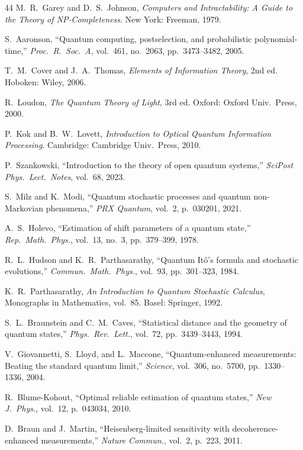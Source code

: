 \documentclass[journal,twocolumn]{IEEEtran}
\theoremstyle{definition}
\theoremstyle{plain}
\begin{document}
\begin{thebibliography}{44}
M.~R.~Garey and D.~S.~Johnson,
\emph{Computers and Intractability: A Guide to the Theory of
NP-Completeness}. New York: Freeman, 1979.

S.~Aaronson, ``Quantum computing, postselection, and probabilistic
polynomial-time,'' \emph{Proc.\ R.\ Soc.\ A}, vol.~461, no.~2063,
pp.~3473--3482, 2005.

T.~M.~Cover and J.~A.~Thomas, \emph{Elements of Information Theory},
2nd ed. Hoboken: Wiley, 2006.

R.~Loudon, \emph{The Quantum Theory of Light}, 3rd ed.
Oxford: Oxford Univ.\ Press, 2000.

P.~Kok and B.~W.~Lovett,
\emph{Introduction to Optical Quantum Information Processing}.
Cambridge: Cambridge Univ.\ Press, 2010.

P.~Szankowski, ``Introduction to the theory of open quantum
systems,'' \emph{SciPost Phys.\ Lect.\ Notes}, vol.~68, 2023.

S.~Milz and K.~Modi, ``Quantum stochastic processes and quantum
non-Markovian phenomena,'' \emph{PRX Quantum}, vol.~2,
p.~030201, 2021.

A.~S.~Holevo, ``Estimation of shift parameters of a quantum state,''
\emph{Rep.\ Math.\ Phys.}, vol.~13, no.~3, pp.~379--399, 1978.

R.~L.~Hudson and K.~R.~Parthasarathy, ``Quantum It\^{o}'s formula
and stochastic evolutions,'' \emph{Commun.\ Math.\ Phys.},
vol.~93, pp.~301--323, 1984.

K.~R.~Parthasarathy, \emph{An Introduction to Quantum Stochastic
Calculus}, Monographs in Mathematics, vol.~85.
Basel: Springer, 1992.

S.~L.~Braunstein and C.~M.~Caves, ``Statistical distance and the
geometry of quantum states,'' \emph{Phys.\ Rev.\ Lett.},
vol.~72, pp.~3439--3443, 1994.

V.~Giovannetti, S.~Lloyd, and L.~Maccone,
``Quantum-enhanced measurements: Beating the standard quantum
limit,'' \emph{Science}, vol.~306, no.~5700, pp.~1330--1336, 2004.

R.~Blume-Kohout, ``Optimal reliable estimation of quantum states,''
\emph{New J.\ Phys.}, vol.~12, p.~043034, 2010.

D.~Braun and J.~Martin, ``Heisenberg-limited sensitivity with
decoherence-enhanced measurements,'' \emph{Nature Commun.},
vol.~2, p.~223, 2011.


\end{thebibliography}
\end{document}
